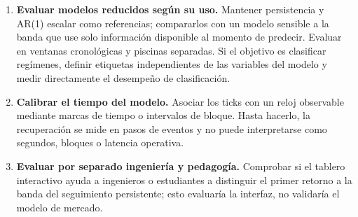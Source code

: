 \begin{enumerate}
  \item \textbf{Evaluar modelos reducidos según su uso.} Mantener persistencia y AR(1) escalar como referencias; compararlos con un modelo sensible a la banda que use solo información disponible al momento de predecir. Evaluar en ventanas cronológicas y piscinas separadas. Si el objetivo es clasificar regímenes, definir etiquetas independientes de las variables del modelo y medir directamente el desempeño de clasificación.
  \item \textbf{Calibrar el tiempo del modelo.} Asociar los ticks con un reloj observable mediante marcas de tiempo o intervalos de bloque. Hasta hacerlo, la recuperación se mide en pasos de eventos y no puede interpretarse como segundos, bloques o latencia operativa.
  \item \textbf{Evaluar por separado ingeniería y pedagogía.} Comprobar si el tablero interactivo ayuda a ingenieros o estudiantes a distinguir el primer retorno a la banda del seguimiento persistente; esto evaluaría la interfaz, no validaría el modelo de mercado.
\end{enumerate}
